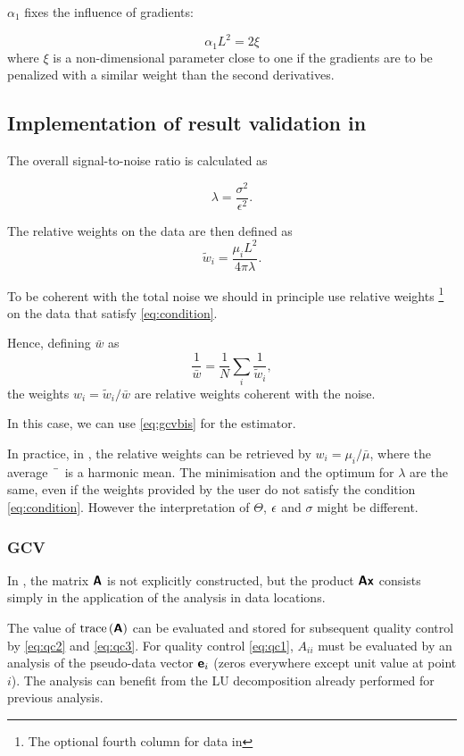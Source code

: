 $\alpha_1$ fixes the influence of gradients:

\begin{equation}
\alpha_1 L^2 = 2 \xi
\end{equation}
where $\xi$ is a non-dimensional parameter close to one if the gradients are to be penalized with a similar weight than the second derivatives.


\subsection{Implementation of result validation in \diva\label{sec:qc}}

The overall signal-to-noise ratio is calculated as

\begin{equation}
\lambda = \frac{\sigma^2 }{\epsilon^2}.
\end{equation}

The relative weights on the data are then defined as
\begin{equation}
\tilde{w}_i= \frac{\mu_i L^2}{4 \pi \lambda}.
\end{equation}

To be coherent with the total noise we should in principle use relative weights 
\footnote{The optional fourth column for data in \diva}
on the data that satisfy \eqref{eq:condition}.

Hence, defining $\bar{w}$ as
\begin{equation}
\frac{1}{\bar{w}} = \frac{1}{N} \sum_i \frac{1}{\tilde{w}_i},
\end{equation}
the weights $w_i=\tilde{w}_i/\bar{w}$ are relative weights coherent with the noise.


In this case, we can use \eqref{eq:gcvbis} for the estimator.

In practice, in \diva, the relative weights can be retrieved by $w_i=\mu_i/\bar{\mu}$, where
the average $\bar{\hphantom{\mu}}$ is a harmonic mean. The minimisation and the optimum for $\lambda$ are the same, even if the weights provided by the user do not satisfy the condition \eqref{eq:condition}. However the interpretation of $\Theta$, $\epsilon$ and $\sigma$ might be different.


\subsubsection{\diva\divaspace GCV}

In \diva, the matrix $\mbox{\boldmath $ \protect\mathsf{A} $}$ is not explicitly constructed, but the product $\mbox{\boldmath $ \protect\mathsf{A} $} \mbox{\boldmath $ \protect\mathsf{x} $}$ consists simply in the application of the analysis in data locations.

The value of $\mathrm{trace}\left( \mbox{\boldmath $ \protect\mathsf{A} $} \right)$ can be evaluated and stored for subsequent quality control by \eqref{eq:qc2} and \eqref{eq:qc3}.
For quality control \eqref{eq:qc1}, $A_{ii}$ must be evaluated by an analysis of the pseudo-data vector $\mbox{\boldmath $ \protect\mathsf{e} $}_i$ (zeros everywhere except unit value at point $i$). The analysis can benefit from the \textsf{LU} decomposition already performed for previous analysis.


